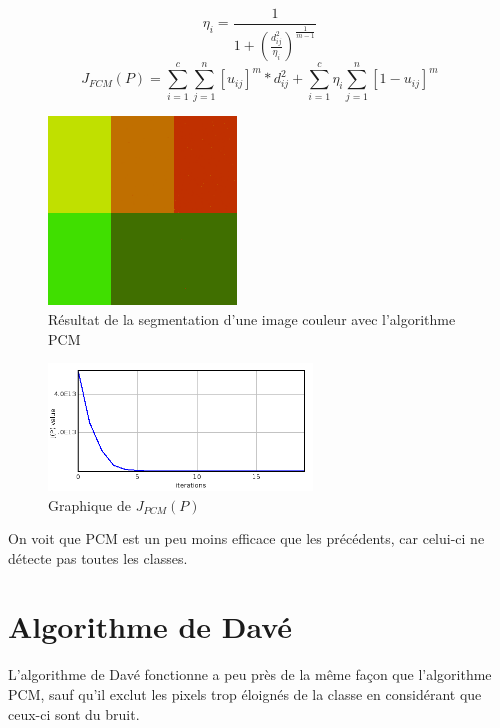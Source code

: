 \documentclass[a4paper,11pt]{article}
\begin{document}
\begin{equation}
  \label{uijPCM}
  \eta_i = \frac{1}{1+\left(\frac{d_{ij}^2}{\eta_i}\right)^{\frac{1}{m-1}}}
\end{equation}
\begin{equation}
  \label{jPCM}
  J_{FCM}(P)=\sum_{i=1}^{c}\sum_{j=1}^{n}[u_{ij}]^m * d_{ij}^2+\sum_{i=1}^{c}\eta_i \sum_{j=1}^{n}[1 - u_{ij}]^m
\end{equation}

\begin{figure}[!h]
  \begin{center}
    \includegraphics[width=5cm]{resultat/PCM.png}
    \caption{Résultat de la segmentation d'une image couleur avec l'algorithme PCM}
    \label{fig:pcm}
  \end{center}
\end{figure}

\begin{figure}[!h]
  \begin{center}
    \includegraphics[width=7cm]{resultat/PCM_graph.png}
    \caption{Graphique de $J_{PCM}(P)$}
    \label{fig:graphPCM}
  \end{center}
\end{figure}

On voit que PCM est un peu moins efficace que les précédents, car celui-ci ne détecte pas toutes les classes.

\section{Algorithme de Davé}
L'algorithme de Davé fonctionne a peu près de la même façon que l'algorithme PCM, sauf qu'il exclut
les pixels trop éloignés de la classe en considérant que ceux-ci sont du bruit.
\end{document}
